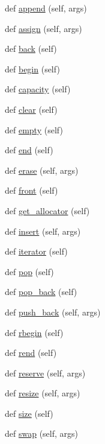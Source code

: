 \begin{DoxyCompactItemize}
\item 
def \hyperlink{classstructural_1_1_double_vector_a45fe440c3b4ff6410e5c2547c164b11d}{append} (self, args)
\item 
def \hyperlink{classstructural_1_1_double_vector_af256273b9cc6765f3a0f82c6e4f57d9d}{assign} (self, args)
\item 
def \hyperlink{classstructural_1_1_double_vector_abceede568b0889e547bb83733d9c1215}{back} (self)
\item 
def \hyperlink{classstructural_1_1_double_vector_a628238eb5526f2f61b521797eec6370c}{begin} (self)
\item 
def \hyperlink{classstructural_1_1_double_vector_a8f1fc41e27da26cbd2e8929bd17424ad}{capacity} (self)
\item 
def \hyperlink{classstructural_1_1_double_vector_a8402b157670fb159bfbf427a436bb6e7}{clear} (self)
\item 
def \hyperlink{classstructural_1_1_double_vector_a80df763179e4b09166b6cc55e41f4a76}{empty} (self)
\item 
def \hyperlink{classstructural_1_1_double_vector_a3ef45c977048ce63e416714bfd1c8274}{end} (self)
\item 
def \hyperlink{classstructural_1_1_double_vector_a38bbbc9e76758ed7cf291a03aa8ca39d}{erase} (self, args)
\item 
def \hyperlink{classstructural_1_1_double_vector_a935d30c3509787f0b666cd115ff9b186}{front} (self)
\item 
def \hyperlink{classstructural_1_1_double_vector_ac7e8bb86b73c121b61eeee708d298503}{get\+\_\+allocator} (self)
\item 
def \hyperlink{classstructural_1_1_double_vector_a5dfb87bc57eb29446f773722bd81b9f9}{insert} (self, args)
\item 
def \hyperlink{classstructural_1_1_double_vector_a6e12e5942ff229a677261cab4c77603e}{iterator} (self)
\item 
def \hyperlink{classstructural_1_1_double_vector_a2a138f2bffa8a94e97f4094215ff3caa}{pop} (self)
\item 
def \hyperlink{classstructural_1_1_double_vector_a320c629545a5554425d5a9e644fc0a64}{pop\+\_\+back} (self)
\item 
def \hyperlink{classstructural_1_1_double_vector_a35c34d4f926de33a8d896df04b040a88}{push\+\_\+back} (self, args)
\item 
def \hyperlink{classstructural_1_1_double_vector_a229f08c4b374ebfebe80547365109f5f}{rbegin} (self)
\item 
def \hyperlink{classstructural_1_1_double_vector_ac2265cdaebcd1e46639e9404b1a70147}{rend} (self)
\item 
def \hyperlink{classstructural_1_1_double_vector_ae9f41d97e7a4868ec310f933aa9ac33b}{reserve} (self, args)
\item 
def \hyperlink{classstructural_1_1_double_vector_a017296535b767fee28c5e183229999e2}{resize} (self, args)
\item 
def \hyperlink{classstructural_1_1_double_vector_a85afc2cc57b2479c01483c375eaac9c7}{size} (self)
\item 
def \hyperlink{classstructural_1_1_double_vector_a54e07f434362a474543df8c9f3a58ca1}{swap} (self, args)
\end{DoxyCompactItemize}
